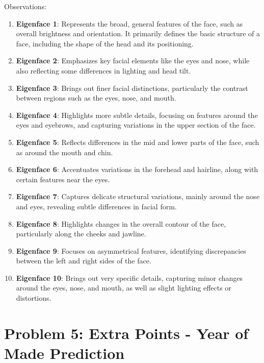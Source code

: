 \documentclass[12pt]{article}
\begin{document}
Observations: \\
\begin{enumerate}
    \item \textbf{Eigenface 1}: Represents the broad, general features of the face, such as overall brightness and orientation. It primarily defines the basic structure of a face, including the shape of the head and its positioning.
    
    \item \textbf{Eigenface 2}: Emphasizes key facial elements like the eyes and nose, while also reflecting some differences in lighting and head tilt.
    
    \item \textbf{Eigenface 3}: Brings out finer facial distinctions, particularly the contrast between regions such as the eyes, nose, and mouth.
    
    \item \textbf{Eigenface 4}: Highlights more subtle details, focusing on features around the eyes and eyebrows, and capturing variations in the upper section of the face.
    
    \item \textbf{Eigenface 5}: Reflects differences in the mid and lower parts of the face, such as around the mouth and chin.
    
    \item \textbf{Eigenface 6}: Accentuates variations in the forehead and hairline, along with certain features near the eyes.
    
    \item \textbf{Eigenface 7}: Captures delicate structural variations, mainly around the nose and eyes, revealing subtle differences in facial form.
    
    \item \textbf{Eigenface 8}: Highlights changes in the overall contour of the face, particularly along the cheeks and jawline.
    
    \item \textbf{Eigenface 9}: Focuses on asymmetrical features, identifying discrepancies between the left and right sides of the face.
    
    \item \textbf{Eigenface 10}: Brings out very specific details, capturing minor changes around the eyes, nose, and mouth, as well as slight lighting effects or distortions.
\end{enumerate}

\section*{Problem 5: Extra Points - Year of Made Prediction}
\end{document}
